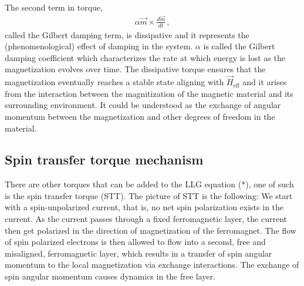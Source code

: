 \documentclass[11pt, onesided]{book}
\theoremstyle{break}
\theoremstyle{break}
\begin{document}
The second term in torque, 
\begin{align*}
\alpha \vec{m}\times \frac{d\vec{m}}{dt}\,,
\end{align*}
called the Gilbert damping term, is dissipative and it represents the (phenomenological) effect of damping in the system. $\alpha$ is called the Gilbert damping coefficient which characterizes the rate at which energy is lost as the magnetization evolves over time. The dissipative torque ensures that the magnetization eventually reaches a stable state aligning with $\vec{H}_{\text{eff}}$ and it arises from the interaction between the magnitization of the magnetic material and its surrounding environment. It could be understood as the exchange of angular momentum between the magnetization and other degrees of freedom in the material. 

\subsection{Spin transfer torque mechanism}
There are other torques that can be added to the LLG equation (*), one of such is the spin transfer torque (STT). The picture of STT is the following: We start with a spin-unpolarized current, that is, no net spin polarization exists in the current. As the current passes through a fixed ferromagnetic layer, the current then get polarized in the direction of magnetization of the ferromagnet. The flow of spin polarized electrons is then allowed to flow into a second, free and misaligned, ferromagnetic layer, which results in a transfer of spin angular momentum to the local magnetization via exchange interactions. The exchange of spin angular momentum causes dynamics in the free layer. \\
\end{document}
